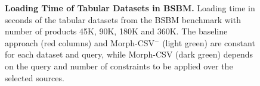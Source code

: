 \begin{figure}[!ht]
{  \label{fig:bsbmload180}
  }
\caption[Loading Time of Tabular Datasets in BSBM.]{\textbf{Loading Time of Tabular Datasets in BSBM.}  Loading time in seconds of the tabular datasets from the BSBM benchmark with number of products 45K, 90K, 180K and 360K. The baseline approach (red columns) and Morph-CSV$^-$ (light green) are constant for each dataset and query, while Morph-CSV (dark green) depends on the query and number of constraints to be applied over the selected sources.}
\label{fig:bsbmload}
\end{figure}



